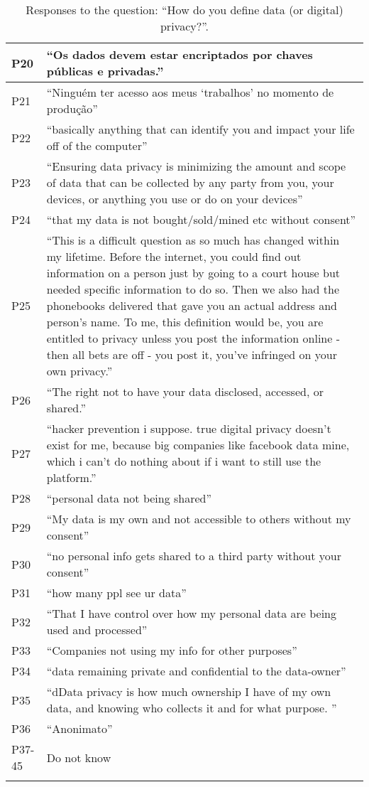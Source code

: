 \begin{longtable}{p{3cm} p{13cm}}
    \hline
    P20 & ``Os dados devem estar encriptados por chaves públicas e privadas.'' \\
    \hline
    P21 & ``Ninguém ter acesso aos meus `trabalhos' no momento de produção'' \\
    \hline
    P22 & ``basically anything that can identify you and impact your life off of the computer'' \\
    \hline
    P23 & ``Ensuring data privacy is minimizing the amount and scope of data that can be collected by any party from you, your devices, or anything you use or do on your devices'' \\
    \hline
    P24 & ``that my data is not bought/sold/mined etc without consent'' \\
    \hline
    P25 & ``This is a difficult question as so much has changed within my lifetime. Before the internet, you could find out information on a person just by going to a court house but needed specific information to do so. Then we also had the phonebooks delivered that gave you an actual address and person's name. To me, this definition would be, you are entitled to privacy unless you post the information online - then all bets are off - you post it, you've infringed on your own privacy.'' \\
    \hline
    P26 & ``The right not to have your data disclosed, accessed, or shared.'' \\
    \hline
    P27 & ``hacker prevention i suppose. true digital privacy doesn't exist for me, because big companies like facebook data mine, which i can't do nothing about if i want to still use the platform.'' \\
    \hline
    P28 & ``personal data not being shared'' \\
    \hline
    P29 & ``My data is my own and not accessible to others without my consent'' \\
    \hline
    P30 & ``no personal info gets shared to a third party without your consent'' \\
    \hline
    P31 & ``how many ppl see ur data'' \\
    \hline
    P32 & ``That I have control over how my personal data are being used and processed'' \\
    \hline
    P33 & ``Companies not using my info for other purposes'' \\
    \hline
    P34 & ``data remaining private and confidential to the data-owner'' \\
    \hline
    P35 & ``dData privacy is how much ownership I have of my own data, and knowing who collects it and for what purpose. '' \\
    \hline
    P36 & ``Anonimato'' \\
    \hline
    P37-45 & Do not know \\
    \hline
    \caption{Responses to the question: ``How do you define data (or digital) privacy?''.}
    \label{table:survey_s1_q5}
\end{longtable}

